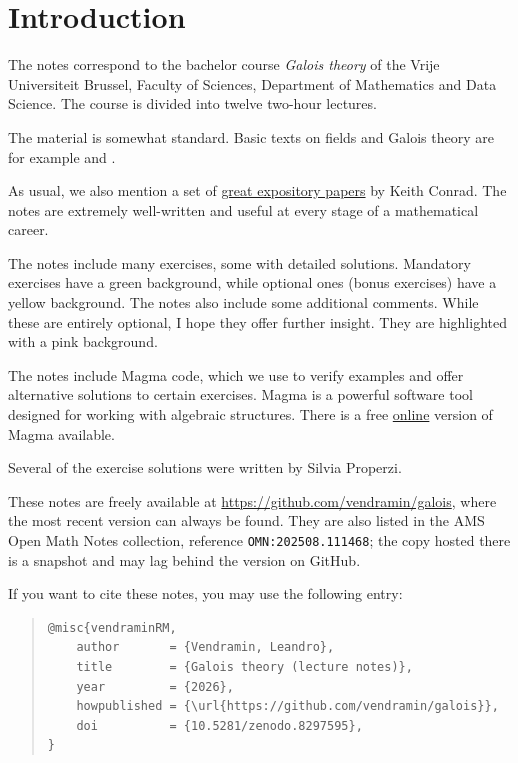 \section*{Introduction}

The notes correspond to the bachelor 
course \emph{Galois theory} of the 
Vrije Universiteit Brussel, 
Faculty of Sciences, 
Department of Mathematics and Data Science. The course
is divided into twelve two-hour lectures. 

The material is somewhat standard. Basic texts on fields and Galois theory 
are for example \cite{MR1645586} and 
\cite{MR3379917}. 

As usual, we also mention a set of 
\href{https://kconrad.math.uconn.edu/blurbs/}{great expository papers} by 
Keith Conrad. The notes are extremely well-written and useful  
at every stage of a mathematical career. 


The notes include many exercises, some with detailed solutions. Mandatory exercises have a \colorbox{green!5!white}{green background}, while optional ones
(bonus exercises) have a \colorbox{yellow!15!white}{yellow background}.
The notes also include some additional comments. While these are entirely optional, I hope they offer further insight. They are highlighted with a \colorbox{red!5!white}{pink background}.

The notes include Magma code, which we use to verify examples and offer alternative solutions to certain exercises. Magma \cite{zbMATH01077111} is a powerful software tool designed for working with algebraic structures. There is a free \href{https://magma.maths.usyd.edu.au/calc/}{online} version of Magma available.

Several of the exercise solutions were written by Silvia Properzi.

These notes are freely available at \url{https://github.com/vendramin/galois},
where the most recent version can always be found. They are also listed in the
AMS Open Math Notes collection, reference \texttt{OMN:202508.111468}; the copy
hosted there is a snapshot and may lag behind the version on GitHub.

If you want to cite these notes, you may use the following entry:

\vspace{1cm}
{\footnotesize
\begin{quote}
\begin{verbatim}
@misc{vendraminRM,
    author       = {Vendramin, Leandro},
    title        = {Galois theory (lecture notes)},
    year         = {2026},
    howpublished = {\url{https://github.com/vendramin/galois}},
    doi          = {10.5281/zenodo.8297595},
}
\end{verbatim}
\end{quote}}
\vspace{.8cm}

